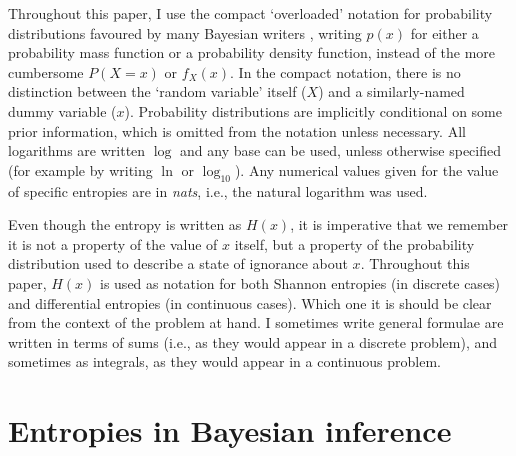 \documentclass[entropy,article,accept,oneauthor,pdftex,10pt,a4paper]{mdpi}
\begin{document}
Throughout this paper, I use the compact
`overloaded' notation for probability distributions favoured by many
Bayesian writers \citep{jaynes2003probability, mackay2003information},
writing $p(x)$ for either a probability mass function
or a probability density function, instead
of the more cumbersome $P(X=x)$ or $f_X(x)$.
In the compact notation, there is no distinction between the
`random variable' itself ($X$) and a similarly-named dummy variable ($x$).
Probability distributions are implicitly conditional on some prior
information, which is omitted from the notation unless necessary.
All logarithms are written $\log$ and any base can be used, unless otherwise
specified (for example by writing $\ln$ or $\log_{10}$). Any numerical
values given for the value of specific entropies are in {\em nats}, i.e.,
the natural logarithm was used.

Even though the entropy is written as $H(x)$, it is imperative that we
remember it is not a property of the value of $x$ itself, but a property
of the probability distribution used to describe a state of ignorance about $x$.
Throughout this paper, $H(x)$ is used as notation for both Shannon entropies
(in discrete cases) and differential entropies (in continuous cases). Which
one it is should be clear from the context of the problem at hand.
I sometimes write general formulae are written in terms of sums (i.e., as they would
appear in a discrete problem), and sometimes as integrals, as they would
appear in a continuous problem.

\section{Entropies in Bayesian inference}
\end{document}
